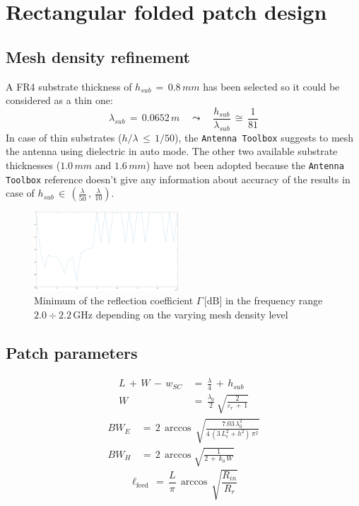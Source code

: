 \documentclass{ieeeojies}
\begin{document}
\section{Rectangular folded patch design}
\subsection{Mesh density refinement}

A FR4 substrate thickness of $h_{sub}\,=\,0.8\,mm$  has been selected so it could be considered as a thin one:
\[\lambda_{sub}\,=\,0.0652\,m\quad \leadsto\quad \frac{h_{sub}}{\lambda_{sub}}\,\cong\,\frac{1}{81}\]
In case of thin substrates ($h/\lambda\,\leq\,1/50$),  the \texttt{Antenna Toolbox} suggests to mesh the antenna using dielectric in auto mode. The other two available substrate thicknesses ($1.0\,mm$ and $1.6\,mm$) have not been adopted because the \texttt{Antenna Toolbox} reference doesn't give any information about accuracy of the results in case of $h_{sub}\,\in\,\left(\frac{\lambda}{50}\,,\,\frac{\lambda}{10}\right)$. 
\begin{center}
	\begin{figure}[h]
		\includegraphics[width=0.48\textwidth]{mesh_levels.png}
		\caption{{ Minimum of the reflection coefficient $\Gamma\, \text{[dB]}$ in the frequency range $2.0\div 2.2\,\text{GHz}$ depending on the varying mesh density level}}
	\end{figure}
\end{center}
\subsection{Patch parameters}
\begin{subequations}
	\begin{align}L\,+\,W\,-\,w_{SC}\,&{=}\,\frac{\lambda}{4}\,+\,h_{sub}\\
		W\,&{=}\,\frac{\lambda_0}{2}\,\sqrt{\frac{2}{\varepsilon_r\,+\,1}}
	\end{align}
\end{subequations}
\begin{subequations}
	\begin{align}
		BW_E\,&{=}\,2\,\arccos\,\sqrt{\frac{7.03\,\lambda_0^2}{4\,(3\,L_e^2+h^2)\,\pi^2}}\\
		BW_H\,&{=}\,2\,\arccos\sqrt{\frac{1}{2\,+\,k_0\,W}}
	\end{align}
\end{subequations}
\begin{equation}
	\ell_{\operatorname{feed}}\,{=}\,\frac{L}{\pi}\,\arccos\,\sqrt{\frac{R_{in}}{R_r}}
\end{equation}
\end{document}
